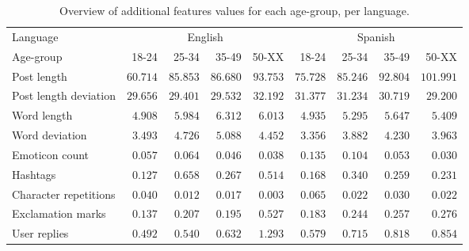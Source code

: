 \documentclass[10pt, a4paper]{article}
\begin{document}
\begin{table*}
\caption{Overview of additional features values for each age-group, per language.}
\label{tab:additionalfeatures-age}
\begin{center}
\begin{tabular}{l|rrrr|rrrr}
\toprule
Language & \multicolumn{4}{|c|}{English} & \multicolumn{4}{|c}{Spanish} \\
Age-group & 18-24 & 25-34 & 35-49 & 50-XX & 18-24 & 25-34 & 35-49 & 50-XX \\
\midrule
Post length & $ 60.714 $ & $ 85.853 $ & $ 86.680 $ & $ 93.753 $ & $ 75.728 $ & $ 85.246 $ & $ 92.804 $ & $ 101.991 $ \\
Post length deviation & $ 29.656 $ & $ 29.401 $ & $ 29.532 $ & $ 32.192 $ & $ 31.377 $ & $ 31.234 $ & $ 30.719 $ & $ 29.200 $ \\
Word length & $ 4.908 $ & $ 5.984 $ & $ 6.312 $ & $ 6.013 $ & $ 4.935 $ & $ 5.295 $ & $ 5.647 $ & $ 5.409 $ \\
Word deviation & $ 3.493 $ & $ 4.726 $ & $ 5.088 $ & $ 4.452 $ & $ 3.356 $ & $ 3.882 $ & $ 4.230 $ & $ 3.963 $ \\
Emoticon count & $ 0.057 $ & $ 0.064 $ & $ 0.046 $ & $ 0.038 $ & $ 0.135 $ & $ 0.104 $ & $ 0.053 $ & $ 0.030 $ \\
Hashtags & $ 0.127 $ & $ 0.658 $ & $ 0.267 $ & $ 0.514 $ & $ 0.168 $ & $ 0.340 $ & $ 0.259 $ & $ 0.231 $ \\
Character repetitions & $ 0.040 $ & $ 0.012 $ & $ 0.017 $ & $ 0.003 $ & $ 0.065 $ & $ 0.022 $ & $ 0.030 $ & $ 0.022 $ \\
Exclamation marks & $ 0.137 $ & $ 0.207 $ & $ 0.195 $ & $ 0.527 $ & $ 0.183 $ & $ 0.244 $ & $ 0.257 $ & $ 0.276 $ \\
User replies & $ 0.492 $ & $ 0.540 $ & $ 0.632 $ & $ 1.293 $ & $ 0.579 $ & $ 0.715 $ & $ 0.818 $ & $ 0.854 $ \\
\bottomrule
\end{tabular}
\end{center}
\end{table*}
\end{document}
